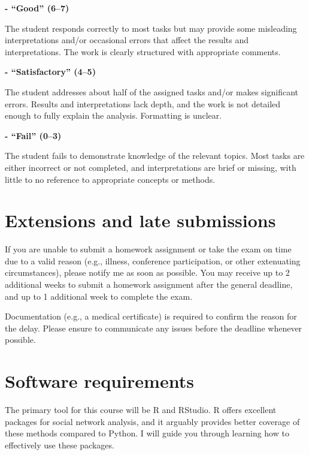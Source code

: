 \documentclass[
]{book}
\begin{document}
\textbf{- ``Good'' (6--7)}

The student responds correctly to most tasks but may provide some misleading interpretations and/or occasional errors that affect the results and interpretations. The work is clearly structured with appropriate comments.

\textbf{- ``Satisfactory'' (4--5)}

The student addresses about half of the assigned tasks and/or makes significant errors. Results and interpretations lack depth, and the work is not detailed enough to fully explain the analysis. Formatting is unclear.

\textbf{- ``Fail'' (0--3)}

The student fails to demonstrate knowledge of the relevant topics. Most tasks are either incorrect or not completed, and interpretations are brief or missing, with little to no reference to appropriate concepts or methods.

\section*{\texorpdfstring{\textbf{Extensions and late submissions}}{Extensions and late submissions}}\label{extensions-and-late-submissions}

If you are unable to submit a homework assignment or take the exam on time due to a valid reason (e.g., illness, conference participation, or other extenuating circumstances), please notify me as soon as possible. You may receive up to 2 additional weeks to submit a homework assignment after the general deadline, and up to 1 additional week to complete the exam.

Documentation (e.g., a medical certificate) is required to confirm the reason for the delay. Please ensure to communicate any issues before the deadline whenever possible.

\section*{\texorpdfstring{\textbf{Software requirements}}{Software requirements}}\label{software-requirements}

The primary tool for this course will be R and RStudio. R offers excellent packages for social network analysis, and it arguably provides better coverage of these methods compared to Python. I will guide you through learning how to effectively use these packages.
\end{document}
